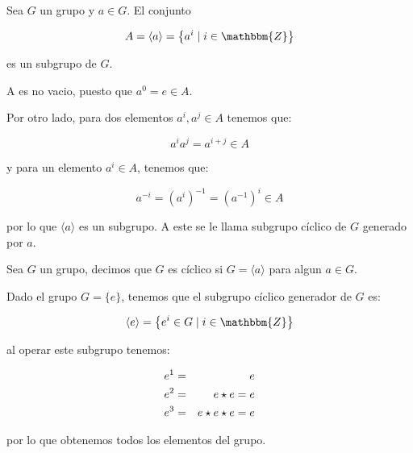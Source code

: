         \begin{definicion}
            Sea $G$ un grupo y $a \in G$. El conjunto

            \begin{equation}
                A = \langle a \rangle = \left\{ a^i \mid i \in \mathbbm{Z} \right\}
            \end{equation}

            es un subgrupo de $G$.

            A es no vacio, puesto que $a^0 = e \in A$.

            Por otro lado, para dos elementos $a^i, a^j \in A$ tenemos que:

            \begin{equation*}
                a^i a^j = a^{i+j} \in A
            \end{equation*}

            y para un elemento $a^i \in A$, tenemos que:

            \begin{equation*}
                a^{-i} = \left( a^i \right)^{-1} = \left( a^{-1} \right)^i \in A
            \end{equation*}

            por lo que $\langle a \rangle$ es un subgrupo. A este se le llama subgrupo cíclico de $G$ generado por $a$.
        \end{definicion}

        \begin{definicion}
            Sea $G$ un grupo, decimos que $G$ es cíclico si $G = \langle a \rangle$ para algun $a \in G$.
        \end{definicion}

        \begin{ejemplo}
            Dado el grupo $G = \{e\}$, tenemos que el subgrupo cíclico generador de $G$ es:

            \begin{equation*}
                \langle e \rangle = \left\{ e^i \in G \mid i \in \mathbbm{Z} \right\}
            \end{equation*}

            al operar este subgrupo tenemos:

            \begin{eqnarray*}
                e^1 & = & e \\
                e^2 & = & e \star e = e \\
                e^3 & = & e \star e \star e = e
            \end{eqnarray*}

            por lo que obtenemos todos los elementos del grupo.
        \end{ejemplo}

